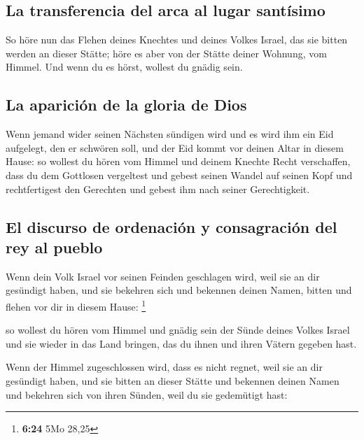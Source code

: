 \hypertarget{la-transferencia-del-arca-al-lugar-santuxedsimo}{%
\subsection{La transferencia del arca al lugar
santísimo}\label{la-transferencia-del-arca-al-lugar-santuxedsimo}}

 So höre nun das Flehen deines Knechtes und deines Volkes
Israel, das sie bitten werden an dieser Stätte; höre es aber von der
Stätte deiner Wohnung, vom Himmel. Und wenn du es hörst, wollest du
gnädig sein.

\hypertarget{la-apariciuxf3n-de-la-gloria-de-dios}{%
\subsection{La aparición de la gloria de
Dios}\label{la-apariciuxf3n-de-la-gloria-de-dios}}

 Wenn jemand wider seinen Nächsten sündigen wird und es
wird ihm ein Eid aufgelegt, den er schwören soll, und der Eid kommt vor
deinen Altar in diesem Hause:  so wollest du hören vom
Himmel und deinem Knechte Recht verschaffen, dass du dem Gottlosen
vergeltest und gebest seinen Wandel auf seinen Kopf und rechtfertigest
den Gerechten und gebest ihm nach seiner Gerechtigkeit.

\hypertarget{el-discurso-de-ordenaciuxf3n-y-consagraciuxf3n-del-rey-al-pueblo}{%
\subsection{El discurso de ordenación y consagración del rey al
pueblo}\label{el-discurso-de-ordenaciuxf3n-y-consagraciuxf3n-del-rey-al-pueblo}}

 Wenn dein Volk Israel vor seinen Feinden geschlagen
wird, weil sie an dir gesündigt haben, und sie bekehren sich und
bekennen deinen Namen, bitten und flehen vor dir in diesem Hause:
\footnote{\textbf{6:24} 5Mo 28,25}

 so wollest du hören vom Himmel und gnädig sein der Sünde
deines Volkes Israel und sie wieder in das Land bringen, das du ihnen
und ihren Vätern gegeben hast.

 Wenn der Himmel zugeschlossen wird, dass es nicht
regnet, weil sie an dir gesündigt haben, und sie bitten an dieser Stätte
und bekennen deinen Namen und bekehren sich von ihren Sünden, weil du
sie gedemütigt hast:

